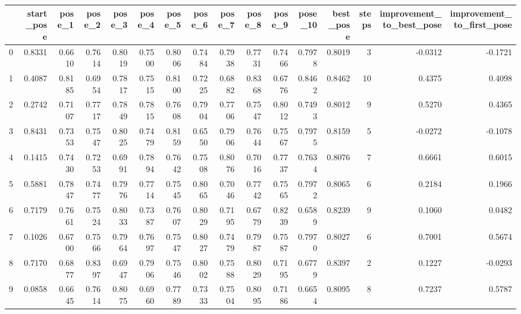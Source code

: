 \begin{tabular}{lrrrrrrrrrrrrrrr}
\toprule
{} &  start\_pose &  pose\_1 &  pose\_2 &  pose\_3 &  pose\_4 &  pose\_5 &  pose\_6 &  pose\_7 &  pose\_8 &  pose\_9 &  pose\_10 &  best\_pose &  steps &  improvement\_to\_best\_pose &  improvement\_to\_first\_pose \\
\midrule
0 &      0.8331 &  0.6610 &  0.7614 &  0.8019 &  0.7500 &  0.8006 &  0.7484 &  0.7938 &  0.7731 &  0.7466 &   0.7978 &     0.8019 &      3 &                   -0.0312 &                    -0.1721 \\
1 &      0.4087 &  0.8185 &  0.6954 &  0.7817 &  0.7515 &  0.8100 &  0.7225 &  0.6882 &  0.8368 &  0.6776 &   0.8462 &     0.8462 &     10 &                    0.4375 &                     0.4098 \\
2 &      0.2742 &  0.7107 &  0.7717 &  0.7849 &  0.7815 &  0.7608 &  0.7904 &  0.7706 &  0.7547 &  0.8012 &   0.7493 &     0.8012 &      9 &                    0.5270 &                     0.4365 \\
3 &      0.8431 &  0.7353 &  0.7547 &  0.8025 &  0.7479 &  0.8159 &  0.6550 &  0.7906 &  0.7644 &  0.7567 &   0.7975 &     0.8159 &      5 &                   -0.0272 &                    -0.1078 \\
4 &      0.1415 &  0.7430 &  0.7253 &  0.6991 &  0.7894 &  0.7642 &  0.7508 &  0.8076 &  0.7016 &  0.7737 &   0.7634 &     0.8076 &      7 &                    0.6661 &                     0.6015 \\
5 &      0.5881 &  0.7847 &  0.7477 &  0.7976 &  0.7714 &  0.7545 &  0.8065 &  0.7046 &  0.7742 &  0.7565 &   0.7972 &     0.8065 &      6 &                    0.2184 &                     0.1966 \\
6 &      0.7179 &  0.7661 &  0.7524 &  0.8033 &  0.7387 &  0.7607 &  0.8029 &  0.7195 &  0.6779 &  0.8239 &   0.6589 &     0.8239 &      9 &                    0.1060 &                     0.0482 \\
7 &      0.1026 &  0.6700 &  0.7566 &  0.7964 &  0.7697 &  0.7547 &  0.8027 &  0.7479 &  0.7987 &  0.7587 &   0.7970 &     0.8027 &      6 &                    0.7001 &                     0.5674 \\
8 &      0.7170 &  0.6877 &  0.8397 &  0.6947 &  0.7906 &  0.7546 &  0.8002 &  0.7588 &  0.8029 &  0.7195 &   0.6779 &     0.8397 &      2 &                    0.1227 &                    -0.0293 \\
9 &      0.0858 &  0.6645 &  0.7614 &  0.8075 &  0.6960 &  0.7789 &  0.7333 &  0.7504 &  0.8095 &  0.7186 &   0.6654 &     0.8095 &      8 &                    0.7237 &                     0.5787 \\
\bottomrule
\end{tabular}
